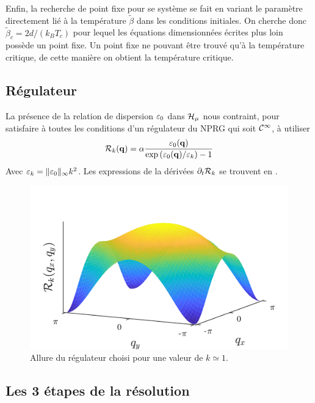 \documentclass[10.5pt]{article}
\begin{document}
\begin{multicols}{2}
Enfin, la recherche de point fixe pour se système se fait en variant le paramètre directement lié à la température $\tilde{\beta}$ dans les conditions initiales. On cherche donc $\tilde{\beta}_c = 2d/(k_BT_c)$ pour lequel les équations dimensionnées écrites plus loin possède un point fixe. Un point fixe ne pouvant être trouvé qu'à la température critique, de cette manière on obtient la température critique.\\



\subsection{Régulateur}

La présence de la relation de dispersion $\varepsilon_0$ dans $\mathcal{H}_\mu$ nous contraint, pour satisfaire à toutes les conditions d'un régulateur du NPRG qui soit $\mathcal{C}^\infty$, à utiliser
\begin{equation}
	\mathcal{R}_k({\bf q}) = \alpha \frac{\varepsilon_0({\bf q})}{\exp{(\varepsilon_0({\bf q})/\varepsilon_k)} -1}
\end{equation}
Avec $\varepsilon_k = \| \varepsilon_0 \|_\infty k^2$. Les expressions de la dérivées $\partial_t \mathcal{R}_k$ se trouvent en . 
\begin{figure}[H]
\begin{center}
	\includegraphics[width=0.8\columnwidth]{RegIsing.pdf}
\end{center}
\caption{Allure du régulateur choisi pour une valeur de $k\simeq 1$.}
\end{figure}



\subsection{Les 3 étapes de la résolution}


\end{multicols}
\end{document}
